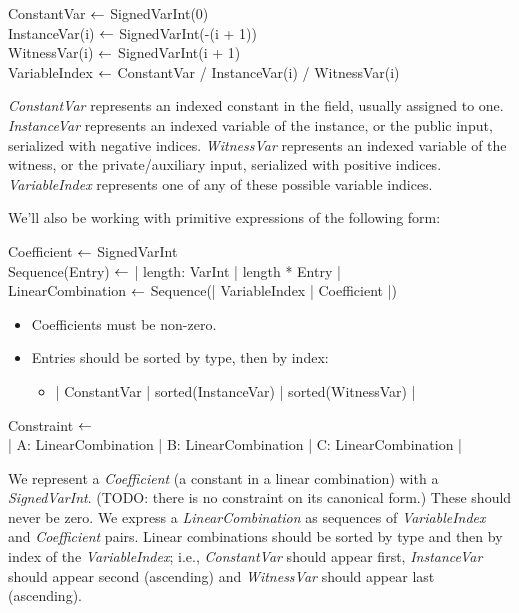 {\ttfamily
ConstantVar $\shortleftarrow$  SignedVarInt(0)\\
InstanceVar(i) $\shortleftarrow$  SignedVarInt(-(i + 1))\\
WitnessVar(i) $\shortleftarrow$  SignedVarInt(i + 1)\\
VariableIndex $\shortleftarrow$ ConstantVar / InstanceVar(i) / WitnessVar(i)
}

\emph{ConstantVar} represents an indexed constant in the field, usually assigned to one. 
\emph{InstanceVar} represents an indexed variable of the instance, or the public input, serialized with negative indices. 
\emph{WitnessVar} represents an indexed variable of the witness, or the private/auxiliary input, serialized with positive indices. 
\emph{VariableIndex} represents one of any of these possible variable indices.

We’ll also be working with primitive expressions of the following form:

{\ttfamily
Coefficient $\shortleftarrow$ SignedVarInt \\
Sequence(Entry) $\shortleftarrow$  | length: VarInt | length * Entry | \\
LinearCombination $\shortleftarrow$  Sequence(| VariableIndex | Coefficient |)
}
\begin{itemize}
    \item Coefficients must be non-zero.
    \item Entries should be sorted by type, then by index:
		\begin{itemize}
        \item | ConstantVar | sorted(InstanceVar) | sorted(WitnessVar) |
		\end{itemize}
\end{itemize}

{\ttfamily
Constraint $\shortleftarrow$  \\
| A: LinearCombination | B: LinearCombination | C: LinearCombination |
}

We represent a \emph{Coefficient} (a constant in a linear combination) with a \emph{SignedVarInt}. 
(TODO: there is no constraint on its canonical form.) These should never be zero. 
We express a \emph{LinearCombination} as sequences of \emph{VariableIndex} and \emph{Coefficient} pairs. 
Linear combinations should be sorted by type and then by index of the \emph{VariableIndex}; 
i.e., \emph{ConstantVar} should appear first, \emph{InstanceVar} should appear second (ascending) and \emph{WitnessVar} should appear last (ascending).

